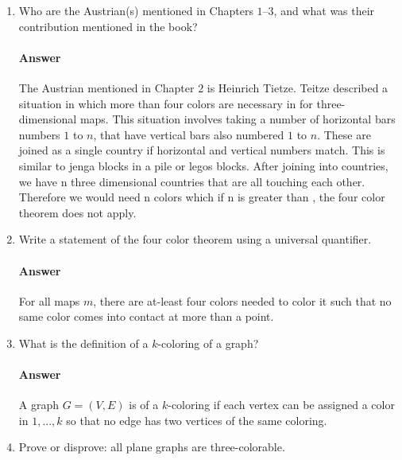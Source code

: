 \documentclass{article}
\begin{document}
\begin{enumerate}

    \item Who are the Austrian(s) mentioned in Chapters $1$--$3$, and what was
    their contribution mentioned in the book?

        \paragraph{Answer}
        The Austrian mentioned in Chapter $2$ is Heinrich Tietze. Teitze
        described a situation in which more than four colors are necessary in
        for three-dimensional maps. This situation involves taking a number of
        horizontal bars numbers $1$ to $n$, that have vertical bars also
        numbered $1$ to $n$. These are joined as a single country  if horizontal
        and vertical numbers match.
        This is similar to jenga blocks in a pile or legos blocks.
        After joining into countries, we have n three dimensional countries
         that are all touching each other.
        Therefore we would need n colors which if n is greater than ,
        the four color theorem does not apply.

    \item Write a statement of the four color theorem using a universal
        quantifier.

        \paragraph{Answer}
        For all maps $m$, there are at-least four colors needed to color it such
        that no same color comes into contact at more than a point.

    \item What is the definition of a $k$-coloring of a graph?

        \paragraph{Answer}
        A graph $G  = (V,E)$ is of a $k$-coloring if each vertex can be assigned
         a color in ${1,...,k}$ so that no edge has two vertices of the same
         coloring.

    \item Prove or disprove: all plane graphs are three-colorable.


\end{enumerate}
\end{document}
